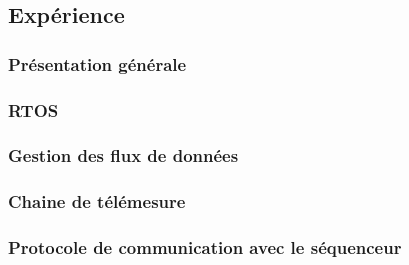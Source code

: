 \subsection{Expérience}
\label{sub:log_exp}


\subsubsection{Présentation générale}


\subsubsection{\acrfull{RTOS}}


\subsubsection{Gestion des flux de données}


\subsubsection{Chaine de télémesure}
\label{subsub:log_exp_telem}


\label{subsubsub:log_exp_telem_tdm}






\subsubsection{Protocole de communication avec le séquenceur}


\newpage
